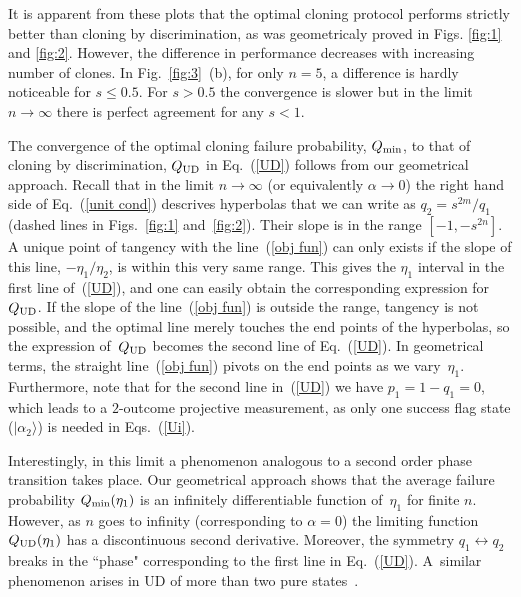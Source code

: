 \documentclass[aps,prl,twocolumn,showpacs]{revtex4}
\begin{document}
It is apparent from these plots that the optimal cloning protocol performs strictly better than cloning by discrimination, as was geometricaly proved in Figs. \ref{fig:1} and \ref{fig:2}. However, the difference in performance decreases with increasing number of clones. In Fig.~\ref{fig:3}~(b), for only $n=5$, a difference is hardly noticeable for $s\le 0.5$. For $s > 0.5$ the convergence is slower but in the limit $n\to\infty$ there is perfect agreement for any $s<1$.

{\color{red}%

The convergence of the optimal cloning failure probability, $Q_{\rm min}$, to that of cloning by discrimination, $Q_{\rm UD}$ in Eq.~(\ref{UD})
follows from our geometrical approach. Recall that in the limit $n\to\infty$ (or equivalently $\alpha\to0$)  the right hand side of Eq.~(\ref{unit cond}) descrives hyperbolas that we can write as $q_2=s^{2m}/q_1$ (dashed lines in Figs.~\ref{fig:1} and~\ref{fig:2}). Their slope is in the range $[-1,-s^{2n}]$.  A unique point of tangency with the line~(\ref{obj fun}) can only exists if the slope of this line, $-\eta_1/\eta_2$, is within this very same range. This gives the $\eta_1$ interval in the first line of~(\ref{UD}), and one can easily obtain the corresponding expression for~$Q_{\rm UD}$.
%
If the slope of the line~(\ref{obj fun}) is outside the range, tangency is not possible, and the optimal line merely touches the end points of the hyperbolas, so the expression of~$Q_{\rm UD}$ becomes the second line of Eq.~(\ref{UD}). In geometrical terms, the straight line~(\ref{obj fun}) pivots on the end points as we vary~$\eta_1$. Furthermore, note that for the second line in~(\ref{UD}) we have $p_1=1-q_1=0$, which leads to a $2$-outcome projective measurement, as only one success flag state ($|\alpha_2\rangle$) is needed in Eqs.~(\ref{Ui}). 
%
%

Interestingly, in this limit a phenomenon analogous to a second order phase transition takes place. Our geometrical approach shows that the average failure probability $Q_{\rm min}(\eta_1)$ is an infinitely differentiable function of~$\eta_1$ for finite $n$. However, as $n$ goes to infinity (corresponding to $\alpha=0$) the limiting function $Q_{\rm UD}(\eta_1)$ has a discontinuous second derivative. Moreover, the symmetry $q_1\leftrightarrow q_2$ breaks  in the ``phase" corresponding to the first line in Eq.~(\ref{UD}). A~similar phenomenon arises in UD of more than two pure states~\cite{Bergou1}.}
\end{document}
